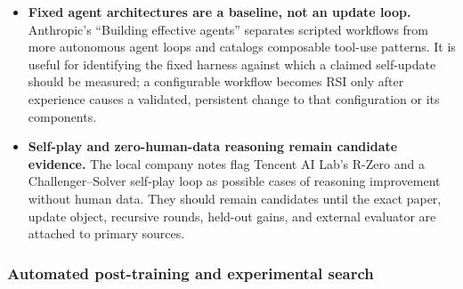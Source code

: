 \begin{itemize}
  \item \textbf{Fixed agent architectures are a baseline, not an update loop.}
  Anthropic's ``Building effective agents'' separates scripted workflows from
  more autonomous agent loops and catalogs composable tool-use patterns. It is
  useful for identifying the fixed harness against which a claimed self-update
  should be measured; a configurable workflow becomes RSI only after experience
  causes a validated, persistent change to that configuration or its components.

  \item \textbf{Self-play and zero-human-data reasoning remain candidate evidence.}
  The local company notes flag Tencent AI Lab's R-Zero and a Challenger--Solver
  self-play loop as possible cases of reasoning improvement without human data.
  They should remain candidates until the exact paper, update object, recursive
  rounds, held-out gains, and external evaluator are attached to primary sources.
\end{itemize}

\subsubsection{Automated post-training and experimental search}

